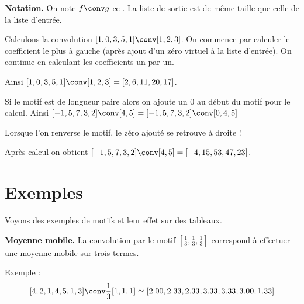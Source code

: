 \documentclass[11pt,class=report,crop=false]{standalone}
\begin{document}
\textbf{Notation.} On note $f \conv g$ ce . 
La liste de sortie est de même taille que celle de la liste d'entrée.

\begin{exemple}
Calculons la convolution $[1,0,3,5,1] \conv [1,2,3]$.
On commence par calculer le coefficient le plus à gauche (après ajout d'un zéro virtuel à la liste d'entrée).
On continue en calculant les coefficients un par un.

Ainsi  $[1,0,3,5,1] \conv [1,2,3] = [2,6,11,20,17]$.
\end{exemple}



\begin{exemple}
Si le motif est de longueur paire alors on ajoute un $0$ au début du motif pour le calcul.
Ainsi $[-1,5,7,3,2] \conv [4,5] = [-1,5,7,3,2] \conv [0,4,5]$

Lorsque l'on renverse le motif, le zéro ajouté se retrouve à droite !


Après calcul on obtient $[-1,5,7,3,2] \conv [4,5] = [-4, 15, 53, 47, 23]$.

\end{exemple}

\section{Exemples}

Voyons des exemples de motifs et leur effet sur des tableaux.

\textbf{Moyenne mobile.}
La convolution par le motif $[\frac13,\frac13,\frac13]$ correspond à effectuer une moyenne mobile sur trois termes.

Exemple :
$$[4, 2, 1, 4, 5, 1, 3] \conv \frac13[1,1,1] \simeq [2.00, 2.33, 2.33, 3.33, 3.33, 3.00, 1.33]$$
\end{document}
